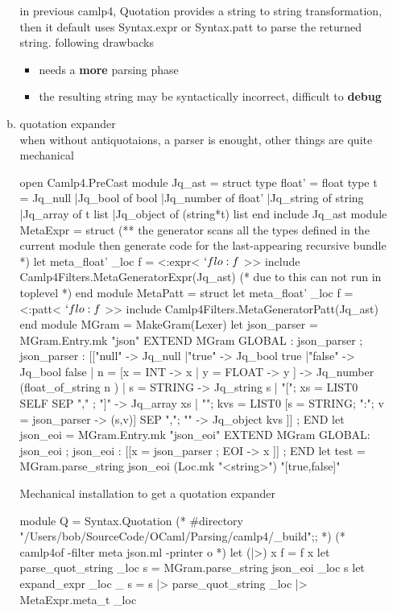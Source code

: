 \begin{enumerate}
\begin{enumerate}[(a)]
in previous camlp4, Quotation provides a string to string
transformation, then it default uses Syntax.expr or Syntax.patt to
parse the returned string. following drawbacks
\begin{itemize}
\item needs a \textbf{more} parsing phase
\item the resulting string may be syntactically incorrect, difficult
  to \textbf{debug}
\end{itemize}

\item quotation expander \\ 
  when without antiquotaions, a parser is enought, other things are
  quite mechanical

\begin{bluecode}
open Camlp4.PreCast 
module Jq_ast = struct 
  type float' = float 
  type t = 
      Jq_null 
    |Jq_bool of bool 
    |Jq_number of float' 
    |Jq_string of string 
    |Jq_array of t list 
    |Jq_object of (string*t) list 
end
include Jq_ast 
module MetaExpr = struct 
  (** the generator scans all the types defined in the current module
      then generate code for the last-appearing recursive bundle
  *)
  let meta_float' _loc f = <:expr< $`flo:f$ >>
  include Camlp4Filters.MetaGeneratorExpr(Jq_ast)
  (* due to this can not run in toplevel *)
end 
module MetaPatt = struct 
  let meta_float' _loc f = <:patt< $`flo:f$ >>
  include Camlp4Filters.MetaGeneratorPatt(Jq_ast)  
end 
module MGram = MakeGram(Lexer)
let json_parser = MGram.Entry.mk "json" 
  EXTEND MGram 
  GLOBAL : json_parser ; 
  json_parser : 
    [["null" -> Jq_null 
     |"true" -> Jq_bool true
     |"false" -> Jq_bool false 
     | n = [x = INT -> x | y = FLOAT -> y  ] -> Jq_number (float_of_string n )
     | s = STRING -> Jq_string s 
     | "["; xs = LIST0 SELF SEP "," ; "]" -> Jq_array xs 
     | "{"; kvs = LIST0 [s = STRING; ":"; v = json_parser -> (s,v)] SEP ","; 
       "}" -> Jq_object kvs 
     ]] ; END 
let json_eoi = MGram.Entry.mk "json_eoi"  
  EXTEND MGram 
  GLOBAL: json_eoi ; 
  json_eoi : [[x = json_parser ; EOI -> x ]] ; END 
let test = 
  MGram.parse_string json_eoi (Loc.mk "<string>") 
    "[true,false]"
\end{bluecode}
  
Mechanical installation to get a quotation expander 
\begin{redcode}
module Q = Syntax.Quotation 
(* #directory "/Users/bob/SourceCode/OCaml/Parsing/camlp4/_build";; *)
(* camlp4of -filter meta json.ml -printer o *)
let (|>) x f = f x 
let parse_quot_string _loc s = 
  MGram.parse_string  json_eoi _loc s 
let expand_expr _loc _ s = 
  s 
  |> parse_quot_string _loc 
  |> MetaExpr.meta_t _loc 


\end{redcode}
\end{enumerate}
\end{enumerate}
